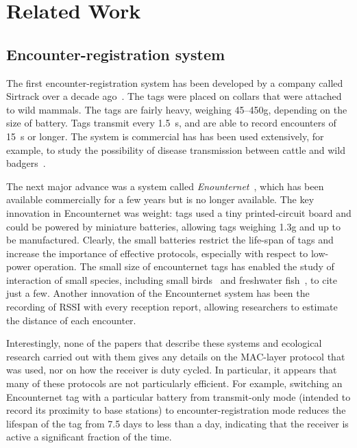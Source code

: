 \section{Related Work}
\label{sec:related-work}

\subsection{Encounter-registration system}
The first encounter-registration system has been developed by a company called Sirtrack 
over a decade ago~\cite{Prangle2006NewRadiocolars}. The tags
were placed on collars that were attached to wild mammals. The tags are fairly heavy, weighing 45--450g, depending on the
size of battery. Tags transmit every 1.5~s, and are able to record encounters of 15~s or longer. The system is
commercial has has been used extensively, for example, to study the possibility of disease transmission between cattle 
and wild badgers~\cite{Bohm2009WildlifeLivestock}.

The next major advance was a system called {\em Enounternet}~\cite{Menhill2012NovelTelemetry,Rutz2012AutomatedMapping}, 
which has been available commercially for a few years
but is no longer available. The key innovation in Encounternet was weight: tags used a tiny printed-circuit board and
could be powered by miniature batteries, allowing tags weighing 1.3g and up to be manufactured. Clearly, the small
batteries restrict the life-span of tags and increase the importance of effective protocols, especially with respect
to low-power operation. The small size of encounternet tags has enabled the study of interaction of small species, 
including small birds~\cite{Levin2015Performance} and freshwater fish~\cite{Tentelier2016FishNetwork}, to cite just a few.
Another innovation of the Encounternet system has been the recording of RSSI with every reception report, allowing
researchers to estimate the distance of each encounter. 

Interestingly, none of the papers that describe these systems and 
ecological research carried out with them gives any details on the
MAC-layer protocol that was used, nor on how the receiver is duty cycled. In particular, it appears that many of these 
protocols are not particularly efficient. For example, switching an Encounternet tag with a particular battery from
transmit-only mode (intended to record its proximity to base stations) to encounter-registration mode reduces the lifespan
of the tag from 7.5 days to less than a day, indicating that the receiver is active a significant fraction of the time.

